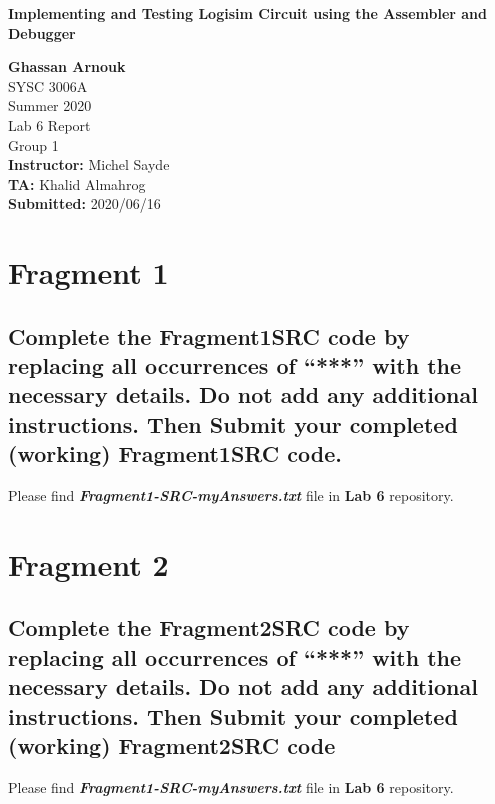 \documentclass{article}
\begin{document}
	\begin{titlepage}
		\begin{center}
			\vspace{1cm}
			{\LARGE\textbf{Implementing and Testing Logisim Circuit using the Assembler and Debugger}}

			\vspace{1.5cm}
			\textbf{\large Ghassan Arnouk}\\
			
			\vspace{1cm}
			\large SYSC 3006A\\
			\large Summer 2020\\
			\large Lab 6 Report\\
			\large Group 1\\
			
						
			\vspace{2cm}
			\textbf{Instructor:} Michel Sayde\\
			
			\vspace{0.1cm}
			\textbf{TA:} Khalid Almahrog\\
			
			\vspace{0.1cm}
			\textbf{Submitted:} 2020/06/16\\			
		\end{center}
	\end{titlepage}
	
	\pagebreak
	
	\section{Fragment 1}
	\subsection{Complete the Fragment1SRC code by replacing all occurrences of “***” with the necessary details. Do not add any additional instructions. Then Submit your completed (working)	Fragment1SRC code.}
	Please find \textbf{\emph{Fragment1-SRC-myAnswers.txt}} file in \textbf{Lab 6} repository.
	
	\section{Fragment 2}
	\subsection{Complete the Fragment2SRC code by replacing all occurrences of “***” with the	necessary details. Do not add any additional instructions. Then Submit your completed (working)	Fragment2SRC code}
	Please find \textbf{\emph{Fragment1-SRC-myAnswers.txt}} file in \textbf{Lab 6} repository.
	
\end{document}
